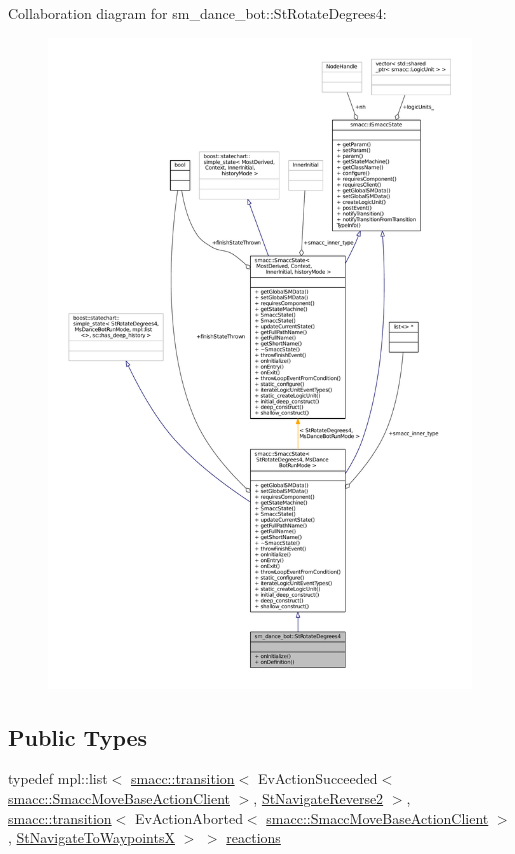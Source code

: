 Collaboration diagram for sm\+\_\+dance\+\_\+bot\+:\+:St\+Rotate\+Degrees4\+:
\nopagebreak
\begin{figure}[H]
\begin{center}
\leavevmode
\includegraphics[width=350pt]{structsm__dance__bot_1_1StRotateDegrees4__coll__graph}
\end{center}
\end{figure}
\subsection*{Public Types}
\begin{DoxyCompactItemize}
\item 
typedef mpl\+::list$<$ \hyperlink{classsmacc_1_1transition}{smacc\+::transition}$<$ Ev\+Action\+Succeeded$<$ \hyperlink{classsmacc_1_1SmaccMoveBaseActionClient}{smacc\+::\+Smacc\+Move\+Base\+Action\+Client} $>$, \hyperlink{structsm__dance__bot_1_1StNavigateReverse2}{St\+Navigate\+Reverse2} $>$, \hyperlink{classsmacc_1_1transition}{smacc\+::transition}$<$ Ev\+Action\+Aborted$<$ \hyperlink{classsmacc_1_1SmaccMoveBaseActionClient}{smacc\+::\+Smacc\+Move\+Base\+Action\+Client} $>$, \hyperlink{structsm__dance__bot_1_1StNavigateToWaypointsX}{St\+Navigate\+To\+WaypointsX} $>$ $>$ \hyperlink{structsm__dance__bot_1_1StRotateDegrees4_a6ea157907b088ed4840f610d659b541b}{reactions}
\end{DoxyCompactItemize}
